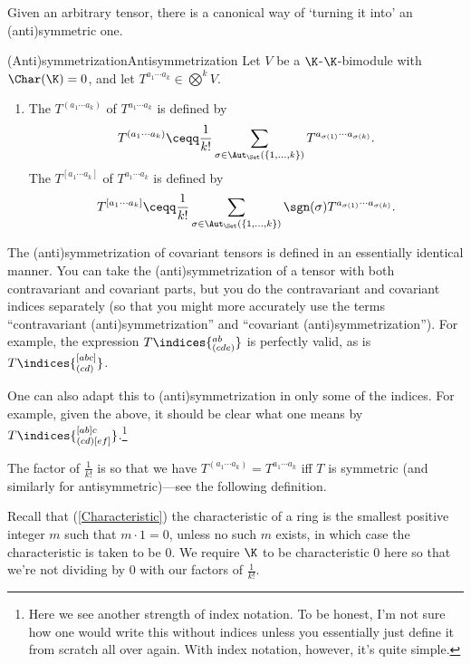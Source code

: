 Given an arbitrary tensor, there is a canonical way of `turning it into' an (anti)symmetric one.
\begin{dfn}{(Anti)symmetrization}{Antisymmetrization}
	Let $V$ be a $\K$-$\K$-bimodule with $\Char (\K )=0$, and let $T^{a_1\cdots a_k}\in \bigotimes ^kV$.
	\begin{enumerate}
		\item The  $T^{(a_1\cdots a_k)}$ of $T^{a_1\cdots a_k}$ is defined by
		\begin{equation}
			T^{(a_1\cdots a_k)}\ceqq \frac{1}{k!}\sum _{\sigma \in \Aut _{\Set}(\{ 1,\ldots ,k\})}T^{a_{\sigma (1)}\cdots a_{\sigma (k)}}.
		\end{equation}
		The  $T^{[a_1\cdots a_k]}$ of $T^{a_1\cdots a_k}$ is defined by
		\begin{equation}
			T^{[a_1\cdots a_k]}\ceqq \frac{1}{k!}\sum _{\sigma \in \Aut _{\Set}(\{ 1,\ldots ,k\})}\sgn (\sigma )T^{a_{\sigma (1)}\cdots a_{\sigma (k)}}.
		\end{equation}
	\end{enumerate}
	\begin{rmk}
		The (anti)symmetrization of covariant tensors is defined in an essentially identical manner.  You can take the (anti)symmetrization of a tensor with both contravariant and covariant parts, but you do the contravariant and covariant indices separately (so that you might more accurately use the terms ``contravariant (anti)symmetrization'' and ``covariant (anti)symmetrization'').  For example, the expression $T\indices{^{ab}_{(cde)}}$ is perfectly valid, as is $T\indices{^{[abc]}_{(cd)}}$.
	\end{rmk}
	\begin{rmk}
		One can also adapt this to (anti)symmetrization in only some of the indices.  For example, given the above, it should be clear what one means by $T\indices{^{[ab]c}_{(cd)[ef]}}$.\footnote{Here we see another strength of index notation.  To be honest, I'm not sure how one would write this without indices unless you essentially just define it from scratch all over again.  With index notation, however, it's quite simple.}
	\end{rmk}
	\begin{rmk}
		The factor of $\frac{1}{k!}$ is so that we have $T^{(a_1\cdots a_k)}=T^{a_1\cdots a_k}$ iff $T$ is symmetric (and similarly for antisymmetric)---see the following definition.
	\end{rmk}
	\begin{rmk}
		Recall that (\cref{Characteristic}) the characteristic of a ring is the smallest positive integer $m$ such that $m\cdot 1=0$, unless no such $m$ exists, in which case the characteristic is taken to be $0$.  We require $\K$ to be characteristic $0$ here so that we're not dividing by $0$ with our factors of $\frac{1}{k!}$.
	\end{rmk}
\end{dfn}
